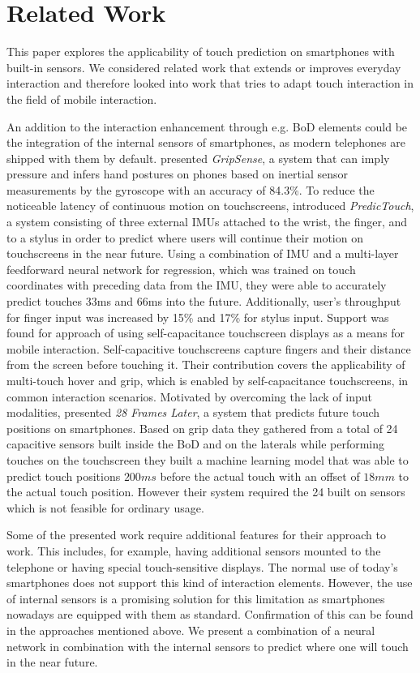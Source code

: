 \section{Related Work}
\label{sec:relw}
This paper explores the applicability of touch prediction on smartphones with built-in sensors. 
We considered related work that extends or improves everyday interaction and therefore looked into work that tries to adapt touch interaction in the field of mobile interaction.

An addition to the interaction enhancement through e.g. BoD elements could be the integration of the internal sensors of smartphones, as modern telephones are shipped with them by default.
\citeauthor{Goel2012a} \cite{Goel2012a} presented \textit{GripSense}, a system that can imply pressure and infers hand postures on phones based on inertial sensor measurements by the gyroscope with an accuracy of 84.3\%.
To reduce the noticeable latency of continuous motion on touchscreens, \citeauthor{Le2017:Predic} \cite{Le2017:Predic} introduced \textit{PredicTouch}, a system consisting of three external IMUs attached to the wrist, the finger, and to a stylus in order to predict where users will continue their motion on touchscreens in the near future.
Using a combination of IMU and a multi-layer feedforward neural network for regression, which was trained on touch coordinates with preceding data from the IMU, they were able to accurately predict touches 33ms and 66ms into the future.
Additionally, user's throughput for finger input was increased by 15\% and 17\% for stylus input.
Support was found for \citeauthor{Hinckley2016} \cite{Hinckley2016} approach of using self-capacitance touchscreen displays as a means for mobile interaction.
Self-capacitive touchscreens capture fingers and their distance from the screen before touching it.  
Their contribution covers the applicability of multi-touch hover and grip, which is enabled by self-capacitance touchscreens, in common interaction scenarios.
Motivated by overcoming the lack of input modalities, \citeauthor{MohdNoor2016} \cite{MohdNoor2016} presented \textit{28 Frames Later}, a system that predicts future touch positions on smartphones.
Based on grip data they gathered from a total of 24 capacitive sensors built inside the BoD and on the laterals while performing touches on the touchscreen they built a machine learning model that was able to predict touch positions $ 200ms $ before the actual touch with an offset of $ 18mm $ to the actual touch position.
However their system required the 24 built on sensors which is not feasible for ordinary usage.

Some of the presented work require additional features for their approach to work.
This includes, for example, having additional sensors mounted to the telephone or having special touch-sensitive displays. 
The normal use of today's smartphones does not support this kind of interaction elements.
However, the use of internal sensors is a promising solution for this limitation as smartphones nowadays are equipped with them as standard.
Confirmation of this can be found in the approaches mentioned above.
We present a combination of a neural network in combination with the internal sensors to predict where one will touch in the near future. 
